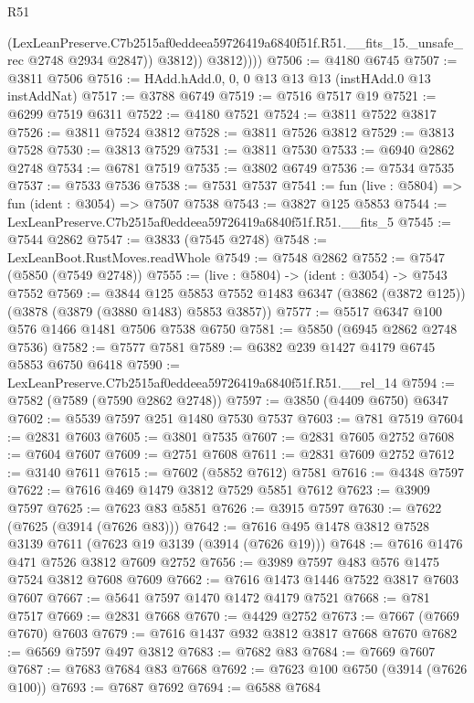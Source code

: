 \begin{lexlean}{R51}
\begin{coremodule}
                  (LexLeanPreserve.C7b2515af0eddeea59726419a6840f51f.R51.__fits_15._unsafe_rec
                    @2748
                    @2934
                    @2847))
                @3812))
            @3812))))
@7506 := @4180 @6745
@7507 := @3811 @7506
@7516 := HAdd.hAdd.{0, 0, 0} @13 @13 @13 (instHAdd.{0} @13 instAddNat)
@7517 := @3788 @6749
@7519 := @7516 @7517 @19
@7521 := @6299 @7519 @6311
@7522 := @4180 @7521
@7524 := @3811 @7522 @3817
@7526 := @3811 @7524 @3812
@7528 := @3811 @7526 @3812
@7529 := @3813 @7528
@7530 := @3813 @7529
@7531 := @3811 @7530
@7533 := @6940 @2862 @2748
@7534 := @6781 @7519
@7535 := @3802 @6749
@7536 := @7534 @7535
@7537 := @7533 @7536
@7538 := @7531 @7537
@7541 := fun (live : @5804) => fun (ident : @3054) => @7507 @7538
@7543 := @3827 @125 @5853
@7544 := LexLeanPreserve.C7b2515af0eddeea59726419a6840f51f.R51.__fits_5
@7545 := @7544 @2862
@7547 := @3833 (@7545 @2748)
@7548 := LexLeanBoot.RustMoves.readWhole
@7549 := @7548 @2862
@7552 := @7547 (@5850 (@7549 @2748))
@7555 := (live : @5804) -> (ident : @3054) -> @7543 @7552
@7569 := @3844
    @125
    @5853
    @7552
    @1483
    @6347
    (@3862 (@3872 @125))
    (@3878 (@3879 (@3880 @1483) @5853 @3857))
@7577 := @5517 @6347 @100 @576 @1466 @1481 @7506 @7538 @6750
@7581 := @5850 (@6945 @2862 @2748 @7536)
@7582 := @7577 @7581
@7589 := @6382 @239 @1427 @4179 @6745 @5853 @6750 @6418
@7590 := LexLeanPreserve.C7b2515af0eddeea59726419a6840f51f.R51.__rel_14
@7594 := @7582 (@7589 (@7590 @2862 @2748))
@7597 := @3850 (@4409 @6750) @6347
@7602 := @5539 @7597 @251 @1480 @7530 @7537
@7603 := @781 @7519
@7604 := @2831 @7603
@7605 := @3801 @7535
@7607 := @2831 @7605 @2752
@7608 := @7604 @7607
@7609 := @2751 @7608
@7611 := @2831 @7609 @2752
@7612 := @3140 @7611
@7615 := @7602 (@5852 @7612) @7581
@7616 := @4348 @7597
@7622 := @7616 @469 @1479 @3812 @7529 @5851 @7612
@7623 := @3909 @7597
@7625 := @7623 @83 @5851
@7626 := @3915 @7597
@7630 := @7622 (@7625 (@3914 (@7626 @83)))
@7642 := @7616 @495 @1478 @3812 @7528 @3139 @7611 (@7623 @19 @3139 (@3914 (@7626 @19)))
@7648 := @7616 @1476 @471 @7526 @3812 @7609 @2752
@7656 := @3989 @7597 @483 @576 @1475 @7524 @3812 @7608 @7609
@7662 := @7616 @1473 @1446 @7522 @3817 @7603 @7607
@7667 := @5641 @7597 @1470 @1472 @4179 @7521
@7668 := @781 @7517
@7669 := @2831 @7668
@7670 := @4429 @2752
@7673 := @7667 (@7669 @7670) @7603
@7679 := @7616 @1437 @932 @3812 @3817 @7668 @7670
@7682 := @6569 @7597 @497 @3812
@7683 := @7682 @83
@7684 := @7669 @7607
@7687 := @7683 @7684 @83 @7668
@7692 := @7623 @100 @6750 (@3914 (@7626 @100))
@7693 := @7687 @7692
@7694 := @6588 @7684

\end{coremodule}
\end{lexlean}
